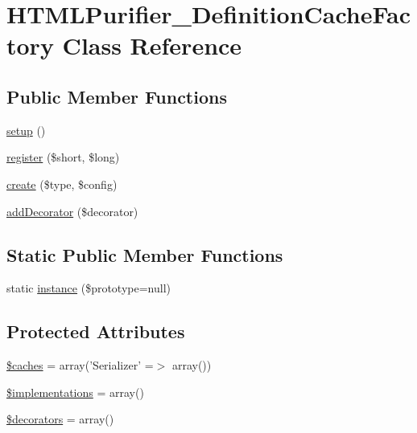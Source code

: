 \hypertarget{classHTMLPurifier__DefinitionCacheFactory}{\section{H\+T\+M\+L\+Purifier\+\_\+\+Definition\+Cache\+Factory Class Reference}
\label{classHTMLPurifier__DefinitionCacheFactory}
}
\subsection*{Public Member Functions}
\begin{DoxyCompactItemize}
\item 
\hyperlink{classHTMLPurifier__DefinitionCacheFactory_a7cf16bd238daf7c0b498f1b65abe34eb}{setup} ()
\item 
\hyperlink{classHTMLPurifier__DefinitionCacheFactory_ab42609824c30ba7cf258dd11b129a83a}{register} (\$short, \$long)
\item 
\hyperlink{classHTMLPurifier__DefinitionCacheFactory_ae094efa128b9fb51f1bfa525582d0c80}{create} (\$type, \$config)
\item 
\hyperlink{classHTMLPurifier__DefinitionCacheFactory_ac43ab976eb2ef0219a4e5c0b10074e98}{add\+Decorator} (\$decorator)
\end{DoxyCompactItemize}
\subsection*{Static Public Member Functions}
\begin{DoxyCompactItemize}
\item 
static \hyperlink{classHTMLPurifier__DefinitionCacheFactory_afa8a529edb34097a7b6c941116fe1265}{instance} (\$prototype=null)
\end{DoxyCompactItemize}
\subsection*{Protected Attributes}
\begin{DoxyCompactItemize}
\item 
\hyperlink{classHTMLPurifier__DefinitionCacheFactory_a9bdfdc5a945ea8d47fabc3adfd50c807}{\$caches} = array('Serializer' =$>$ array())
\item 
\hyperlink{classHTMLPurifier__DefinitionCacheFactory_a0c7a76120ee346ab4c3c993d0f58cc4b}{\$implementations} = array()
\item 
\hyperlink{classHTMLPurifier__DefinitionCacheFactory_a6e7d9245dd426ea65b11c25ae06b0c5b}{\$decorators} = array()
\end{DoxyCompactItemize}


